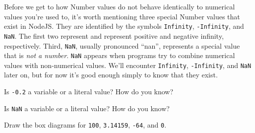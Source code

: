 
Before we get to how \textsf{Number} values do not behave identically to numerical values you're used to, it's worth mentioning three special \textsf{Number} values that exist in NodeJS. They are identified by the symbols \texttt{Infinity}, \texttt{-Infinity}, and \texttt{NaN}. The first two represent and represent positive and negative infinity, respectively. Third, \texttt{NaN}, usually pronounced ``nan'', represents a special value that is \emph{not a number}. \texttt{NaN} appears when programs try to combine numerical values with non-numerical values. We'll encounter \texttt{Infinity}, \texttt{-Infinity}, and \texttt{NaN} later on, but for now it's good enough simply to know that they exist.

\begin{question}
  Is \texttt{-0.2} a variable or a literal value? How do you know?
\end{question}

\begin{question}
  Is \texttt{NaN} a variable or a literal value? How do you know?
\end{question}

\begin{question}
  Draw the box diagrams for \texttt{100}, \texttt{3.14159}, \texttt{-64}, and \texttt{0}.
\end{question}

